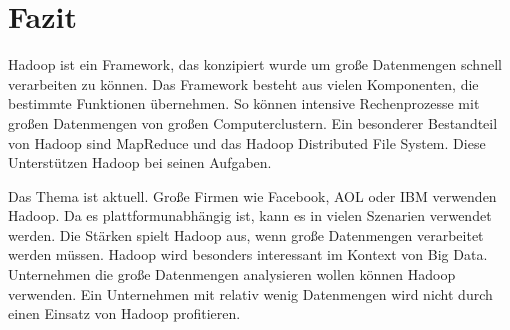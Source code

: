 \newpage
\section{Fazit}
Hadoop ist ein Framework, das konzipiert wurde um große Datenmengen schnell verarbeiten zu können. Das Framework besteht aus vielen Komponenten, die bestimmte Funktionen übernehmen. So können intensive Rechenprozesse mit großen Datenmengen von großen Computerclustern. Ein besonderer Bestandteil von Hadoop sind MapReduce und das Hadoop Distributed File System. Diese Unterstützen Hadoop bei seinen Aufgaben.

Das Thema ist aktuell. Große Firmen wie Facebook, AOL oder IBM verwenden Hadoop. Da es plattformunabhängig ist, kann es in vielen Szenarien verwendet werden. Die Stärken spielt Hadoop aus, wenn große Datenmengen verarbeitet werden müssen. Hadoop wird besonders interessant im Kontext von Big Data. Unternehmen  die große Datenmengen analysieren wollen können Hadoop verwenden. Ein Unternehmen mit relativ wenig Datenmengen wird nicht durch einen Einsatz von Hadoop profitieren.  
